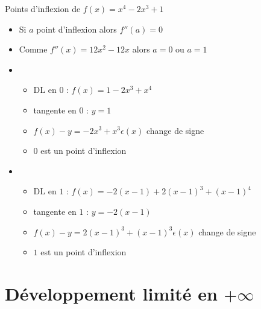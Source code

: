 \begin{frame}
\begin{exemple}
Points d'inflexion de $f(x)=x^4-2x^3+1$

\pause

\begin{itemize}
  \item Si $a$ point d'inflexion alors $f''(a)=0$
\pause
  \item Comme $f''(x)=12x^2-12x$ alors $a=0$ ou $a=1$
\pause
  \item 
  \begin{itemize}
     \item DL en $0$ :  $f(x)= 1-2x^3+x^4$
\pause
     \item tangente en $0$ : $y=1$
\pause
     \item $f(x)-y=-2x^3+x^3\epsilon(x)$ change de signe
\pause
     \item $0$ est un point d'inflexion 
  \end{itemize}
\pause
  \item 
  \begin{itemize}
     \item DL en $1$ :  $f(x)=-2(x-1) + 2(x-1)^3+(x-1)^4$
\pause
     \item tangente en $1$ : $y=-2(x-1)$
\pause
     \item $f(x)-y=2(x-1)^3+(x-1)^3\epsilon(x)$ change de signe 
\pause
     \item $1$ est un point d'inflexion 
  \end{itemize}
\end{itemize}



\end{exemple}
\end{frame}

\begin{frame}
\end{frame}


\section{Développement limité en $+\infty$}

